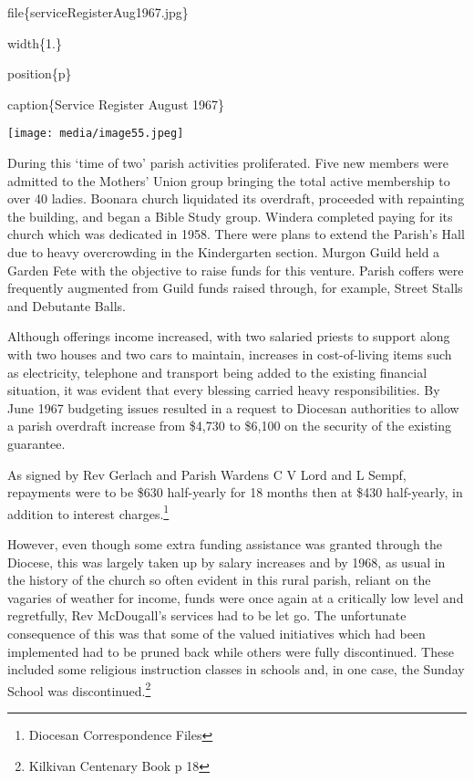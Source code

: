 file\{serviceRegisterAug1967.jpg\}

width\{1.\}

position\{p\}

caption\{Service Register August 1967\}

\texttt{[image: media/image55.jpeg]}

During this `time of two' parish activities proliferated. Five new members were admitted to the Mothers' Union group bringing the total active membership to over 40 ladies. Boonara church liquidated its overdraft, proceeded with repainting the building, and began a Bible Study group. Windera completed paying for its church which was dedicated in 1958. There were plans to extend the Parish's Hall due to heavy overcrowding in the Kindergarten section. Murgon Guild held a Garden Fete with the objective to raise funds for this venture. Parish coffers were frequently augmented from Guild funds raised through, for example, Street Stalls and Debutante Balls.

Although offerings income increased, with two salaried priests to support along with two houses and two cars to maintain, increases in cost-of-living items such as electricity, telephone and transport being added to the existing financial situation, it was evident that every blessing carried heavy responsibilities. By June 1967 budgeting issues resulted in a request to Diocesan authorities to allow a parish overdraft increase from \$4,730 to \$6,100 on the security of the existing guarantee.

As signed by Rev Gerlach and Parish Wardens C V Lord and L Sempf, repayments were to be \$630 half-yearly for 18 months then at \$430 half-yearly, in addition to interest charges.\footnote{Diocesan Correspondence Files}

However, even though some extra funding assistance was granted through the Diocese, this was largely taken up by salary increases and by 1968, as usual in the history of the church so often evident in this rural parish, reliant on the vagaries of weather for income, funds were once again at a critically low level and regretfully, Rev McDougall's services had to be let go. The unfortunate consequence of this was that some of the valued initiatives which had been implemented had to be pruned back while others were fully discontinued. These included some religious instruction classes in schools and, in one case, the Sunday School was discontinued.\footnote{Kilkivan Centenary Book p 18}

